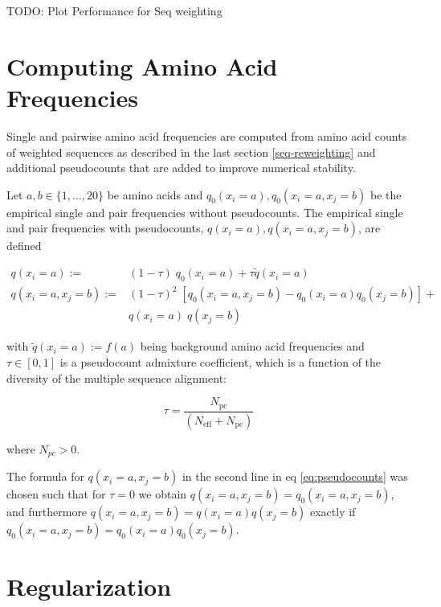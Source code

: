 \documentclass[11pt,a4paper,twoside]{book}
\newcommand{\eq}{\!=\!}
\theoremstyle{definition}
\theoremstyle{definition}
\theoremstyle{remark}
\begin{document}
TODO: Plot Performance for Seq weighting

\section{Computing Amino Acid Frequencies}\label{amino-acid-frequencies}

Single and pairwise amino acid frequencies are computed from amino acid
counts of weighted sequences as described in the last section
\ref{seq-reweighting} and additional pseudocounts that are added to
improve numerical stability.

Let \(a,b \in \{1,\ldots,20\}\) be amino acids and
\(q_0(x_i=a), q_0(x_i=a,x_j=b)\) be the empirical single and pair
frequencies without pseudocounts. The empirical single and pair
frequencies with pseudocounts, \(q(x_i=a), q(x_i=a, x_j=b)\), are
defined

\begin{align}
    q(x_i \eq a) :=& (1-\tau) \;  q_0(x_i \eq a) + \tau \tilde{q}(x_i\eq a) \\
    q(x_i \eq a, x_j \eq b) :=& (1-\tau)^2  \; [ q_0(x_i \eq a, x_j \eq b) - q_0(x_i \eq a)  q_0(x_j \eq b) ] + \nonumber\\
                            & q(x_i \eq a) \; q(x_j \eq b) 
\label{eq:pseudocounts}
\end{align}

with \(\tilde{q}(x_i \eq a) := f(a)\) being background amino acid
frequencies and \(\tau \in [0,1]\) is a pseudocount admixture
coefficient, which is a function of the diversity of the multiple
sequence alignment:

\begin{equation}
    \tau = \frac{N_\mathrm{pc}}{(N_\mathrm{eff} + N_\mathrm{pc})}
\label{eq:tau}
\end{equation}

where \(N_{pc} > 0\).

The formula for \(q(x_i \eq a, x_j \eq b)\) in the second line in eq
\eqref{eq:pseudocounts} was chosen such that for \(\tau \eq0\) we obtain
\(q(x_i \eq a, x_j \eq b) = q_0(x_i \eq a, x_j \eq b)\), and furthermore
\(q(x_i \eq a, x_j \eq b) = q(x_i \eq a) q(x_j \eq b)\) exactly if
\(q_0(x_i \eq a, x_j \eq b) = q_0(x_i \eq a) q_0(x_j \eq b)\).

\section{Regularization}\label{methods-regularization}
\end{document}
